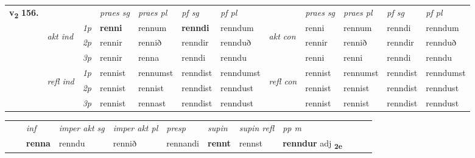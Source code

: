 \begin{tabular}{llllllllllll} \toprule
\multirow{4}{*}{{{\textbf{v{\textsubscript{2}}} \Large{\textbf{156.}}}}}  & &   &  \textit{praes sg}  & \textit{praes pl}  &\textit{ pf sg} & \textit{pf pl} &  &  \textit{praes sg}  & \textit{praes pl}  & \textit{pf sg} & \textit{pf pl } \\*
	\cmidrule{4-7} \cmidrule{9-12}
 & \multirow{3}{*}{\begin{turn}{90}\textit{akt ind}\end{turn}} & {\textit{1p}} & \textbf{renni} & rennum    & \textbf{renndi} & renndum & \multirow{3}{*}{\begin{turn}{90}\textit{akt con}\end{turn}} &renni & rennum & renndi & renndum\\*
& &  {\textit{2p}} &  rennir  & rennið   & renndir & rennduð & & rennir & rennið & renndir & rennduð \\*
& &  {\textit{3p}} & rennir & renna   & renndi & renndu & & renni & renni& renndi & renndu  \\*
\cmidrule{4-7} \cmidrule{9-12}
 &\multirow{3}{*}{\begin{turn}{90}\textit{refl ind}\end{turn}} & {\textit{1p}} & rennist & rennumst    & renndist & renndumst & \multirow{3}{*}{\begin{turn}{90}\textit{refl con}\end{turn}}  &rennist & rennumst & renndist & renndumst\\*
 &&  {\textit{2p}} &  rennist  & rennist   & renndist & renndust & &rennist & rennist & renndist & renndust \\*
& &  {\textit{3p}} & rennist & rennast   & renndist & renndust & & rennist & rennist& renndist & renndust  \\*
\cmidrule{4-7} \cmidrule{9-12}
\end{tabular}


\begin{tabular}{llllllllllll}
 & & \textit{inf} & \textit{imper akt sg} & \textit{imper akt pl}   & \textit{presp} & \textit{supin} & \textit{supin refl} & \textit{pp m}     \\*
  & & \textbf{renna} & renndu  & rennið   & rennandi &  \textbf{rennt} & rennst & \textbf{renndur} adj \textbf{\textsubscript{2e}} \\*
\cmidrule{1-12}
\end{tabular}



